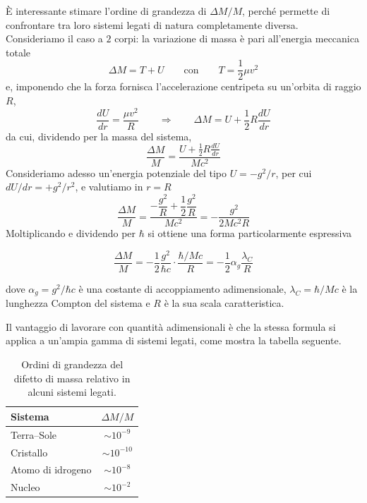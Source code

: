 È interessante stimare l'ordine di grandezza di $\Delta M/M$, perché permette di confrontare tra loro sistemi legati di natura completamente diversa. \\

Consideriamo il caso a $2$ corpi: la variazione di massa è pari all'energia meccanica totale
%
\begin{equation}
    \Delta M = T + U \qquad \text{con} \qquad T = \frac{1}{2} \mu v^2
\end{equation}
e, imponendo che la forza fornisca l'accelerazione centripeta su un'orbita di raggio $R$,
%
\begin{equation}
    \frac{dU}{dr} = \frac{\mu v^2}{R} \qquad \Longrightarrow \qquad \Delta M = U + \frac{1}{2} R \frac{dU}{dr}
\end{equation}
da cui, dividendo per la massa del sistema,
%
\begin{equation}
    \frac{\Delta M}{M} = \frac{U + \frac{1}{2} R \frac{dU}{dr}}{M c^2}
\end{equation}
Consideriamo adesso un'energia potenziale del tipo $U = - g^2/r$, per cui $dU/dr = + g^2/r^2$, e valutiamo in $r = R$
%
\begin{equation}
    \frac{\Delta M}{M} = \frac{- \dfrac{g^2}{R} + \dfrac{1}{2} \dfrac{g^2}{R}}{M c^2} = - \frac{g^2}{2 M c^2 R}
\end{equation}
Moltiplicando e dividendo per $\hbar$ si ottiene una forma particolarmente espressiva
%
\begin{tcolorbox}[colback=black!5!white, colframe=black!45!white, boxrule=0.8pt]
\begin{equation}
    \frac{\Delta M}{M} = - \frac{1}{2} \frac{g^2}{\hbar c} \cdot \frac{\hbar / M c}{R} = - \frac{1}{2} \alpha_g \frac{\lambda_C}{R}
\end{equation}
\end{tcolorbox}
dove $\alpha_g = g^2/\hbar c$ è una costante di accoppiamento adimensionale, $\lambda_C = \hbar/Mc$ è la lunghezza Compton del sistema e $R$ è la sua scala caratteristica. 

Il vantaggio di lavorare con quantità adimensionali è che la stessa formula si applica a un'ampia gamma di sistemi legati, come mostra la tabella seguente. 

\begin{table}[htbp]
\centering
\begin{tabular}{lc}
\hline
Sistema & $\Delta M / M$ \\
\hline
Terra--Sole & $\sim 10^{-9}$ \\
Cristallo & $\sim 10^{-10}$ \\
Atomo di idrogeno & $\sim 10^{-8}$ \\
Nucleo & $\sim 10^{-2}$ \\
\hline
\end{tabular}
\caption{Ordini di grandezza del difetto di massa relativo in alcuni sistemi legati.}
\label{tab:difetto_massa}
\end{table}

